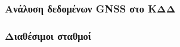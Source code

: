\begin{frame}
  \frametitle{Ανάλυση δεδομένων GNSS στο ΚΔΔ}
  \framesubtitle{}
  \label{}
  
\end{frame}
\note{}

\begin{frame}
  \frametitle{Διαθέσιμοι σταθμοί}
  \framesubtitle{}
  \label{}

\end{frame}
\note{}